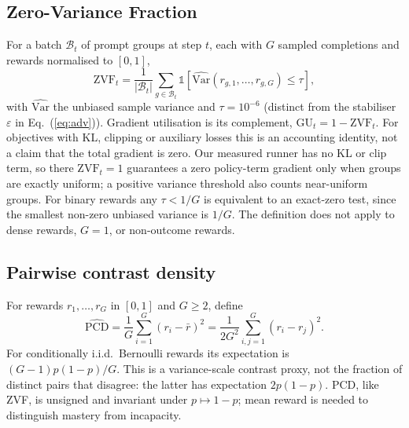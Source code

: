 \subsection{Zero-Variance Fraction}
For a batch $\mathcal{B}_t$ of prompt groups at step $t$, each with $G$
sampled completions and rewards normalised to $[0,1]$,
\begin{equation}
\mathrm{ZVF}_t = \frac{1}{|\mathcal{B}_t|}\sum_{g\in\mathcal{B}_t}
\mathbb{1}\!\left[\widehat{\mathrm{Var}}(r_{g,1},\dots,r_{g,G}) \le \tau\right],
\end{equation}
with $\widehat{\mathrm{Var}}$ the unbiased sample variance and
$\tau = 10^{-6}$ (distinct from the stabiliser $\varepsilon$ in Eq.~(\ref{eq:adv})). Gradient utilisation is its complement,
$\mathrm{GU}_t = 1 - \mathrm{ZVF}_t$. For objectives with KL, clipping or
auxiliary losses this is an accounting identity, not a claim that the total
gradient is zero. Our measured runner has no KL or clip term, so there
$\mathrm{ZVF}_t = 1$ guarantees a zero policy-term gradient only when groups
are exactly uniform; a positive variance threshold also counts near-uniform groups.
For binary rewards any $\tau<1/G$ is equivalent to an exact-zero test, since the smallest non-zero unbiased variance is $1/G$. The definition does not apply to
dense rewards, $G = 1$, or non-outcome rewards.

\subsection{Pairwise contrast density}
For rewards $r_1,\ldots,r_G$ in $[0,1]$ and $G\ge2$, define
\begin{equation}
\widehat{\mathrm{PCD}}=\frac1G\sum_{i=1}^G(r_i-\bar r)^2
=\frac{1}{2G^2}\sum_{i,j=1}^G(r_i-r_j)^2.
\end{equation}
For conditionally i.i.d.\ Bernoulli rewards its expectation is
$(G-1)p(1-p)/G$. This is a variance-scale contrast proxy, not the
fraction of distinct pairs that disagree: the latter has expectation
$2p(1-p)$. PCD, like ZVF, is unsigned and invariant under $p\mapsto1-p$;
mean reward is needed to distinguish mastery from incapacity.

